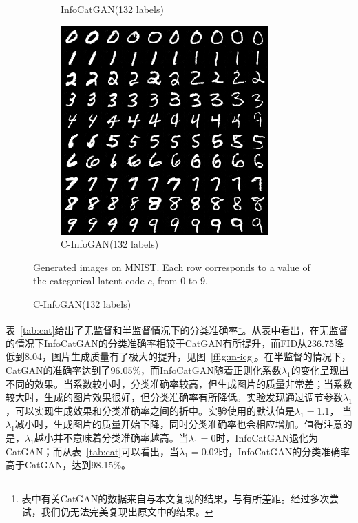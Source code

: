 \begin{figure}[htbp]
\begin{subfigure}[b]{\trif\textwidth}
    \caption{InfoCatGAN(132 labels)}
    \label{ffig:m-ss-icg}
  \end{subfigure}
  \begin{subfigure}[b]{\trif\textwidth}
    \includegraphics[width=\textwidth]{Img/ig-132labels.png}
    \caption{C-InfoGAN(132 labels)}
    \label{ffig:m-ss-ig}
  \end{subfigure}

  {Generated images on MNIST. Each row corresponds to a value of the categorical latent code $c$, from 0 to 9.}
  \label{fig:mnist}
\end{figure}

表~\ref{tab:cat}给出了无监督和半监督情况下的分类准确率\footnote{表中有关CatGAN的数据来自与本文复现的结果，与\citet{springenberg2015unsupervised}有所差距。经过多次尝试，我们仍无法完美复现出原文中的结果。}。从表中看出，在无监督的情况下InfoCatGAN的分类准确率相较于CatGAN有所提升，而FID从236.75降低到8.04，图片生成质量有了极大的提升，见图~\ref{ffig:m-icg}。在半监督的情况下，CatGAN的准确率达到了96.05\%，而InfoCatGAN随着正则化系数$\lambda_1$的变化呈现出不同的效果。当系数较小时，分类准确率较高，但生成图片的质量非常差；当系数较大时，生成的图片效果很好，但分类准确率有所降低。实验发现通过调节参数$\lambda_1$，可以实现生成效果和分类准确率之间的折中。实验使用的默认值是$\lambda_1 = 1.1$，
当$\lambda_1$减小时，生成图片的质量开始下降，同时分类准确率也会相应增加。值得注意的是，$\lambda_1$越小并不意味着分类准确率越高。当$\lambda_1=0$时，InfoCatGAN退化为CatGAN；而从表~\ref{tab:cat}可以看出，当$\lambda_1=0.02$时，InfoCatGAN的分类准确率高于CatGAN，达到98.15\%。

